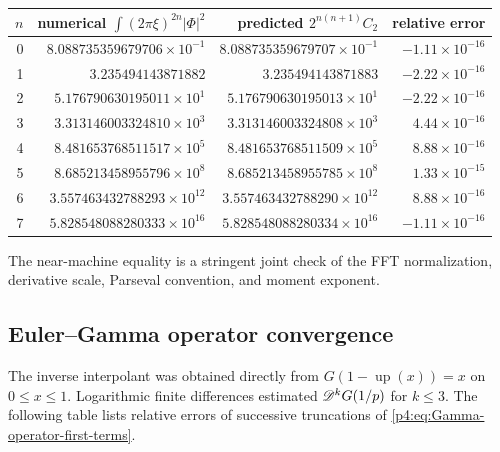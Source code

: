 \documentclass[11pt,oneside]{article}
\theoremstyle{definition}
\theoremstyle{remark}
\newcommand{\Up}{\operatorname{up}}
\begin{document}
\begin{center}
\small
\begin{tabular}{@{}rrrr@{}}
\toprule
$n$ & numerical $\int(2\pi\xi)^{2n}|\Phi|^2$ & predicted $2^{n(n+1)}C_2$ & relative error\\
\midrule
0 & $8.088735359679706\times10^{-1}$ & $8.088735359679707\times10^{-1}$ & $-1.11\times10^{-16}$\\
1 & $3.235494143871882$ & $3.235494143871883$ & $-2.22\times10^{-16}$\\
2 & $5.176790630195011\times10^{1}$ & $5.176790630195013\times10^{1}$ & $-2.22\times10^{-16}$\\
3 & $3.313146003324810\times10^{3}$ & $3.313146003324808\times10^{3}$ & $4.44\times10^{-16}$\\
4 & $8.481653768511517\times10^{5}$ & $8.481653768511509\times10^{5}$ & $8.88\times10^{-16}$\\
5 & $8.685213458955796\times10^{8}$ & $8.685213458955785\times10^{8}$ & $1.33\times10^{-15}$\\
6 & $3.557463432788293\times10^{12}$ & $3.557463432788290\times10^{12}$ & $8.88\times10^{-16}$\\
7 & $5.828548088280333\times10^{16}$ & $5.828548088280334\times10^{16}$ & $-1.11\times10^{-16}$\\
\bottomrule
\end{tabular}
\end{center}

The near-machine equality is a stringent joint check of the FFT normalization, derivative
scale, Parseval convention, and moment exponent.

\subsection{Euler--Gamma operator convergence}

The inverse interpolant was obtained directly from
$G(1-\Up(x))=x$ on $0\leq x\leq1$.  Logarithmic finite differences estimated
$\mathscr D^kG(1/p)$ for $k\leq3$.  The following table lists relative errors of successive
truncations of \eqref{p4:eq:Gamma-operator-first-terms}.
\end{document}
